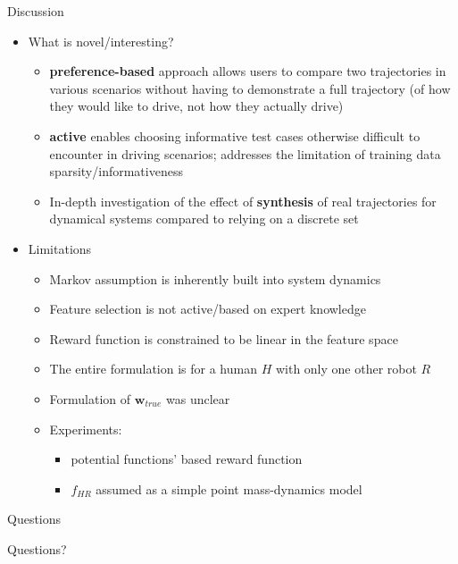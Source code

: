 \documentclass[9pt,mathserif]{beamer}
\begin{document}
\begin{frame}[t]{Discussion}
\begin{itemize} \itemsep 0.05in
	\item What is novel/interesting?
	\begin{itemize} \itemsep 0.025in
		\item \textbf{preference-based} approach allows users to compare two trajectories in various scenarios without having to demonstrate a full trajectory (of how they would like to drive, not how they actually drive)
		\item \textbf{active} enables choosing informative test cases otherwise difficult to encounter in driving scenarios; addresses the limitation of training data sparsity/informativeness
		\item In-depth investigation of the effect of \textbf{synthesis} of real trajectories for dynamical systems compared to relying on a discrete set
	\end{itemize}
	\item Limitations
	\begin{itemize} \itemsep 0.025in
		\item Markov assumption is inherently built into system dynamics
		\item Feature selection is not active/based on expert knowledge
		\item Reward function is constrained to be linear in the feature space
		\item The entire formulation is for a human $H$ with only one other robot $R$
		\item Formulation of $\textbf{w}_{true}$ was unclear
		\item Experiments:
		\begin{itemize} \itemsep 0.025in
			\item potential functions' based reward function
			\item $f_{HR}$ assumed as a simple point mass-dynamics model
		\end{itemize}
	\end{itemize}
\end{itemize}
\end{frame}

\begin{frame}[t]{Questions}
	\begin{center} \Huge Questions? \end{center}
\end{frame}

\setcounter{finalframe}{\value{framenumber}}
\end{document}
